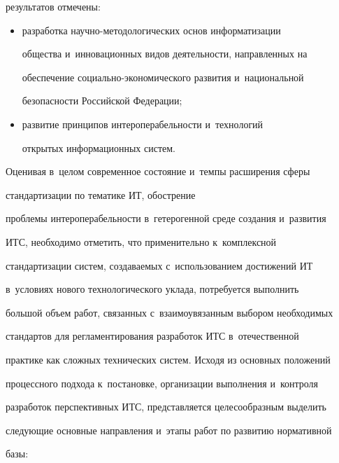 результатов отмечены:


      \begin{itemize}


      \item разработка научно-методологических основ информатизации 


общества и~инновационных видов деятельности, направленных на 


обеспечение со\-ци\-аль\-но-эко\-но\-ми\-че\-ско\-го развития и~национальной 


безопасности Российской Федерации;


      \item развитие принципов интероперабельности и~технологий 


открытых информационных систем.


      \end{itemize}


      


      Оценивая в~целом современное состояние и~темпы расширения сферы 


стандартизации по тематике ИТ, обострение 


проблемы интероперабельности в~гетерогенной среде создания и~развития 


ИТС, необходимо отметить, что применительно к~комплексной 


стандартизации систем, создаваемых с~использованием достижений ИТ 


в~условиях нового технологического уклада, потребуется выполнить 


большой объем работ, связанных с~взаимоувязанным выбором необходимых 


стандартов для регламентирования разработок ИТС в~отечественной 


практике как сложных технических систем. Исходя из основных положений 


процессного подхода к~постановке, организации выполнения и~контроля 


разработок перспективных ИТС, представляется целесообразным выделить 


следующие основные направления и~этапы работ по развитию нормативной 


базы: 


